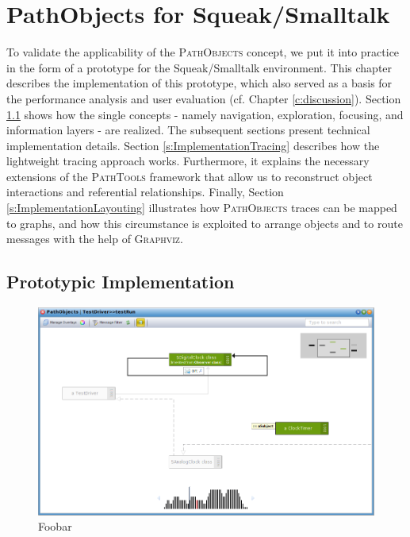 \chapter{PathObjects for Squeak/Smalltalk}
\label{c:implementation}
To validate the applicability of the \textsc{PathObjects} concept, we put it into practice in the form of a prototype for the Squeak/Smalltalk environment.
This chapter describes the implementation of this prototype, which also served as a basis for the performance analysis and user evaluation (cf. Chapter \ref{c:discussion}).
Section \ref{s:ImplementationPrototype} shows how the single concepts - namely navigation, exploration, focusing, and information layers - are realized.
The subsequent sections present technical implementation details.
Section \ref{s:ImplementationTracing} describes how the lightweight tracing approach works.
Furthermore, it explains the necessary extensions of the \textsc{PathTools} framework that allow us to reconstruct object interactions and referential relationships.
Finally, Section \ref{s:ImplementationLayouting} illustrates how \textsc{PathObjects} traces can be mapped to graphs, and how this circumstance is exploited to arrange objects and to route messages with the help of \textsc{Graphviz}.

\section{Prototypic Implementation}
\label{s:ImplementationPrototype}

\begin{figure}
	\centering
	\includegraphics[width=1\textwidth]{../images/04-ImplMainWindow}
	\caption[TOC Caption]{Foobar}
	\label{fig:ImplementationMainWindow}
\end{figure}

